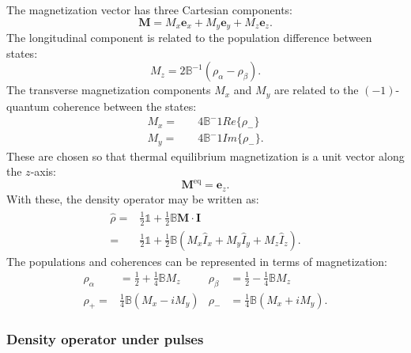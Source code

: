 The magnetization vector has three Cartesian components:
\begin{equation}
  \mathbf{M} = M_x\mathbf{e}_x + M_y\mathbf{e}_y + M_z\mathbf{e}_z.
\end{equation}
 The longitudinal component is related to the population difference between states:
 \begin{equation}
   M_z = 2\mathbb{B}^{-1}(\rho_\alpha - \rho_\beta).
 \end{equation}
The transverse magnetization components $M_x$ and $M_y$ are related to the $(-1)$-quantum coherence between the states:
\begin{align}
  M_x =&\quad4\mathbb{B}^-1Re\{\rho_-\}\\
  M_y =&\quad4\mathbb{B}^-1Im\{\rho_-\}.
\end{align}
These are chosen so that thermal equilibrium magnetization is a unit vector
along the $z$-axis:
\begin{equation}
  \mathbf{M}^{\text{eq}} = \mathbf{e}_z.
\end{equation}
With these, the density operator may be written as:
\begin{align}
  \hat{\rho} =& \frac{1}{2}\mathbb{1} + \frac{1}{2}\mathbb{B}\mathbf{M}\cdot\hat{\mathbf{I}}\\
  =& \frac{1}{2}\mathbb{1} + \frac{1}{2}\mathbb{B}(M_x\hat{I}_x + M_y\hat{I}_y + M_z\hat{I}_z).
\end{align}
The populations and coherences can be represented in terms of magnetization:
\begin{align}
  \rho_\alpha &= \frac{1}{2} + \frac{1}{4}\mathbb{B}M_z & \rho_\beta &= \frac{1}{2} - \frac{1}{4}\mathbb{B}M_z\\
  \rho_+ =&  \frac{1}{4}\mathbb{B}(M_x - iM_y) & \rho_- &= \frac{1}{4}\mathbb{B}(M_x + iM_y).
\end{align}

\subsubsection{Density operator under pulses}

